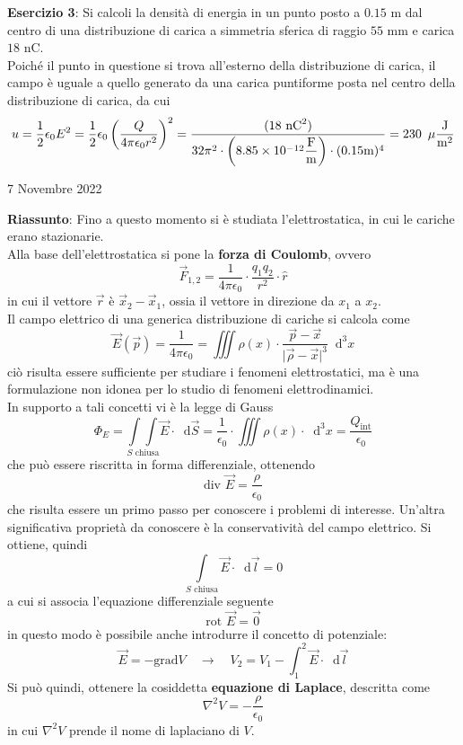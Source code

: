 \documentclass[a4paper]{extarticle}
\newcommand\dif{\mathop{}\!\mathrm{d}}
\begin{document}
\vspace{2em}
\noindent
\textbf{Esercizio 3}: Si calcoli la densità di energia in un punto posto a $0.15$ m dal centro di una distribuzione di carica a simmetria sferica di raggio $55$ mm e carica $18$ nC.\\
Poiché il punto in questione si trova all'esterno della distribuzione di carica, il campo è uguale a quello generato da una carica puntiforme posta nel centro della distribuzione di carica, da cui
\[u=\frac{1}{2}\epsilon_0E^2=\frac{1}{2}\epsilon_0\left(\frac{Q}{4 \pi \epsilon_0 r^2}\right)^2 = \frac{(18 \text{ nC}^2)}{32 \pi^2 \cdot \left(8.85 \times 10^{-12} \dfrac{\text{F}}{\text{m}}\right) \cdot (0.15 \text{m})^4} = 230 \hspace{0.5em}\mu\frac{\text{J}}{\text{m}^2}\]

\newpage
\noindent
\begin{center}
  7 Novembre 2022
\end{center}
\textbf{Riassunto}: Fino a questo momento si è studiata l'elettrostatica, in cui le cariche erano stazionarie.\\
Alla base dell'elettrostatica si pone la \textbf{forza di Coulomb}, ovvero
\[\vec{F}_{1,2} = \dfrac{1}{4 \pi \epsilon_0} \cdot \dfrac{q_1 q_2}{r^2} \cdot \hat{r}\]
in cui il vettore $\vec{r}$ è $\vec{x}_2 - \vec{x}_1$, ossia il vettore in direzione da $x_1$ a $x_2$.\\
Il campo elettrico di una generica distribuzione di cariche si calcola come
\[\vec{E}(\vec{p}) = \dfrac{1}{4 \pi \epsilon_0} = \iiint \rho(x) \cdot \dfrac{\vec p - \vec x}{\vert \vec \rho - \vec x \vert^3} \dif^3 x\]
ciò risulta essere sufficiente per studiare i fenomeni elettrostatici, ma è una formulazione non idonea per lo studio di fenomeni elettrodinamici.\\
In supporto a tali concetti vi è la legge di Gauss
\[\Phi_E = \underset{S \text{ chiusa}}{\int \int} \vec E \cdot \dif \vec{S} = \dfrac{1}{\epsilon_0} \cdot \iiint \rho(x) \cdot \dif^3 x = \dfrac{Q_{\text{int}}}{\epsilon_0}\]
che può essere riscritta in forma differenziale, ottenendo
\[\text{div } \vec E = \dfrac{\rho}{\epsilon_0}\]
che risulta essere un primo passo per conoscere i problemi di interesse. Un'altra significativa proprietà da conoscere è la conservatività del campo elettrico. Si ottiene, quindi
\[\underset{S \text{ chiusa}}{\int} \vec E \cdot \dif \vec l = 0\]
a cui si associa l'equazione differenziale seguente
\[\text{rot } \vec E = \vec 0\]
in questo modo è possibile anche introdurre il concetto di potenziale:
\[\vec E = -\text{grad} V \hspace{1em} \rightarrow \hspace{1em} V_2 = V_1 - \int_1^2 \vec E \cdot \dif \vec l\]
Si può quindi, ottenere la cosiddetta \textbf{equazione di Laplace}, descritta come
\[\nabla^2 V = - \dfrac{\rho}{\epsilon_0}\]
in cui $\nabla^2 V$ prende il nome di laplaciano di $V$.
\end{document}
